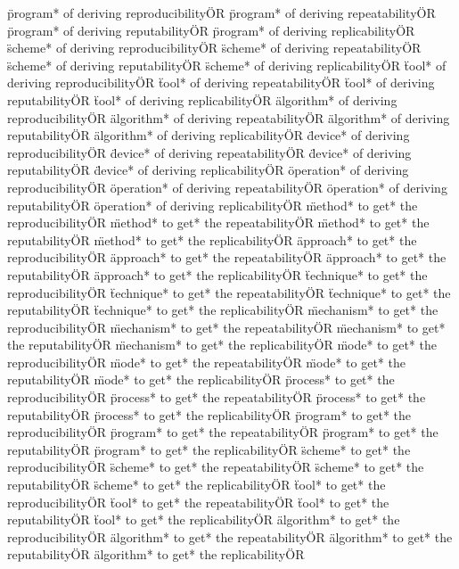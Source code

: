 \documentclass[
10pt, %
a4paper, %
oneside, %
headinclude,footinclude, %
BCOR5mm, %
]{scrartcl}
\begin{document}
\"program* of deriving reproducibility\" OR \"program* of deriving repeatability\" OR \"program* of deriving reputability\" OR \"program* of deriving replicability\" OR 
\"scheme* of deriving reproducibility\" OR \"scheme* of deriving repeatability\" OR \"scheme* of deriving reputability\" OR \"scheme* of deriving replicability\" OR 
\"tool* of deriving reproducibility\" OR \"tool* of deriving repeatability\" OR \"tool* of deriving reputability\" OR \"tool* of deriving replicability\" OR 
\"algorithm* of deriving reproducibility\" OR \"algorithm* of deriving repeatability\" OR \"algorithm* of deriving reputability\" OR \"algorithm* of deriving replicability\" OR 
\"device* of deriving reproducibility\" OR \"device* of deriving repeatability\" OR \"device* of deriving reputability\" OR \"device* of deriving replicability\" OR 
\"operation* of deriving reproducibility\" OR \"operation* of deriving repeatability\" OR \"operation* of deriving reputability\" OR \"operation* of deriving replicability\" OR 
\"method* to get* the reproducibility\" OR \"method* to get* the repeatability\" OR \"method* to get* the reputability\" OR \"method* to get* the replicability\" OR 
\"approach* to get* the reproducibility\" OR \"approach* to get* the repeatability\" OR \"approach* to get* the reputability\" OR \"approach* to get* the replicability\" OR 
\"technique* to get* the reproducibility\" OR \"technique* to get* the repeatability\" OR \"technique* to get* the reputability\" OR \"technique* to get* the replicability\" OR 
\"mechanism* to get* the reproducibility\" OR \"mechanism* to get* the repeatability\" OR \"mechanism* to get* the reputability\" OR \"mechanism* to get* the replicability\" OR 
\"mode* to get* the reproducibility\" OR \"mode* to get* the repeatability\" OR \"mode* to get* the reputability\" OR \"mode* to get* the replicability\" OR 
\"process* to get* the reproducibility\" OR \"process* to get* the repeatability\" OR \"process* to get* the reputability\" OR \"process* to get* the replicability\" OR 
\"program* to get* the reproducibility\" OR \"program* to get* the repeatability\" OR \"program* to get* the reputability\" OR \"program* to get* the replicability\" OR 
\"scheme* to get* the reproducibility\" OR \"scheme* to get* the repeatability\" OR \"scheme* to get* the reputability\" OR \"scheme* to get* the replicability\" OR 
\"tool* to get* the reproducibility\" OR \"tool* to get* the repeatability\" OR \"tool* to get* the reputability\" OR \"tool* to get* the replicability\" OR 
\"algorithm* to get* the reproducibility\" OR \"algorithm* to get* the repeatability\" OR \"algorithm* to get* the reputability\" OR \"algorithm* to get* the replicability\" OR 
\end{document}
